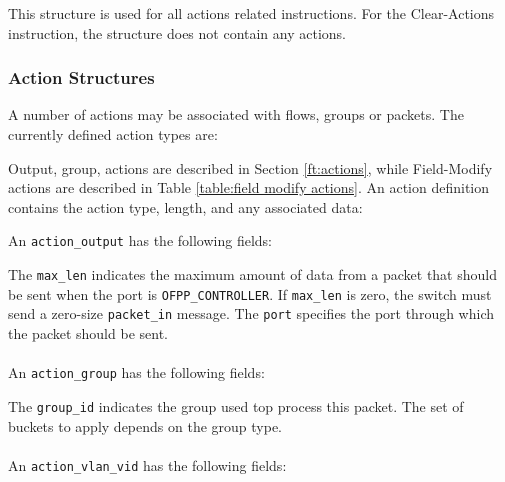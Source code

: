 
This structure is used for all actions related instructions. For the Clear-Actions instruction, the structure does not contain any actions.

\subsubsection{Action Structures}
A number of actions may be associated with flows, groups or packets.  The currently defined action types are:

 
Output, group,  actions are described in Section \ref{ft:actions}, while Field-Modify actions are described in Table \ref{table:field modify actions}.  An action definition contains the action type, length, and any associated data:


An \verb|action_output| has the following fields:


The \verb|max_len| indicates the maximum amount of data from a packet that should be sent when the port is \verb|OFPP_CONTROLLER|.  If \verb|max_len| is zero, the switch must send a zero-size \verb|packet_in| message.  The \verb|port| specifies the port through which the packet should be sent.
\\\\
An \verb|action_group| has the following fields:


The \verb|group_id| indicates the group used top process this packet.  The set of buckets to apply depends on the group type.
\\\\
An \verb|action_vlan_vid| has the following fields:

